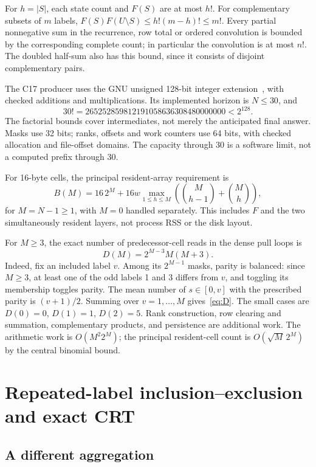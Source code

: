 \documentclass[11pt]{article}
\theoremstyle{definition}
\theoremstyle{remark}
\begin{document}
For $h=|S|$, each state count and $F(S)$ are at most $h!$.
For complementary subsets of $m$ labels,
$F(S)F(U\setminus S)\leq h!(m-h)!\leq m!$.
Every partial nonnegative sum in the recurrence, row total or ordered
convolution is bounded by the corresponding complete count; in particular
the convolution is at most $n!$. The doubled half-sum also has this bound,
since it consists of disjoint complementary pairs.

The C17 producer uses the GNU unsigned 128-bit integer
extension~\cite{gcc}, with checked additions and multiplications.
Its implemented horizon is $N\leq30$, and
\[
 30!=265252859812191058636308480000000<2^{128}.
\]
The factorial bounds cover intermediates, not merely the anticipated final
answer. Masks use 32 bits; ranks, offsets and work counters use 64 bits,
with checked allocation and file-offset domains. The capacity through 30
is a software limit, not a computed prefix through 30.

For 16-byte cells, the principal resident-array requirement is
\begin{equation}
 B(M)=16\,2^M+16w\max_{1\leq h\leq M}
 \left(\binom M{h-1}+\binom Mh\right),
 \label{eq:memory}
\end{equation}
for $M=N-1\geq1$, with $M=0$ handled separately. This includes $F$ and the two
simultaneously resident layers, not process RSS or the disk layout.

For $M\geq3$, the exact number of predecessor-cell reads in the dense
pull loops is
\begin{equation}
 D(M)=2^{M-3}M(M+3).
 \label{eq:D}
\end{equation}
Indeed, fix an included label $v$. Among its $2^{M-1}$ masks, parity is
balanced: since $M\geq3$, at least one of the odd labels 1 and 3 differs
from $v$, and toggling its membership toggles parity. The mean number of
$s\in[0,v]$ with the prescribed parity is
$(v+1)/2$. Summing over $v=1,\ldots,M$ gives~\eqref{eq:D}.
The small cases are $D(0)=0$, $D(1)=1$, $D(2)=5$.
Rank construction, row clearing and summation, complementary products,
and persistence are additional work. The arithmetic work is
$O(M^2 2^M)$; the principal resident-cell count is
$O(\sqrt{M}\,2^M)$ by the central binomial bound.

\section{Repeated-label inclusion--exclusion and exact CRT}
\label{sec:ie}

\subsection{A different aggregation}
\end{document}

